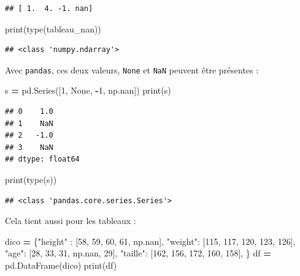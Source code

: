 \documentclass[
  12pt,
]{book}
\newenvironment{Shaded}{\begin{snugshade}}{\end{snugshade}}
\newcommand{\BuiltInTok}[1]{#1}
\newcommand{\DecValTok}[1]{\textcolor[rgb]{0.00,0.00,0.81}{#1}}
\newcommand{\NormalTok}[1]{#1}
\newcommand{\OperatorTok}[1]{\textcolor[rgb]{0.81,0.36,0.00}{\textbf{#1}}}
\newcommand{\StringTok}[1]{\textcolor[rgb]{0.31,0.60,0.02}{#1}}
\newcommand{\VariableTok}[1]{\textcolor[rgb]{0.00,0.00,0.00}{#1}}
\numberwithin{equation}{section}
\numberwithin{countremarque}{section}
\begin{document}
\begin{lstlisting}
## [ 1.  4. -1. nan]
\end{lstlisting}

\begin{Shaded}
\begin{Highlighting}[]
\BuiltInTok{print}\NormalTok{(}\BuiltInTok{type}\NormalTok{(tableau\_nan))}
\end{Highlighting}
\end{Shaded}

\begin{lstlisting}
## <class 'numpy.ndarray'>
\end{lstlisting}

Avec \texttt{pandas}, ces deux valeurs, \texttt{None} et \texttt{NaN} peuvent être présentes :

\begin{Shaded}
\begin{Highlighting}[]
\NormalTok{s }\OperatorTok{=}\NormalTok{ pd.Series([}\DecValTok{1}\NormalTok{, }\VariableTok{None}\NormalTok{, }\OperatorTok{{-}}\DecValTok{1}\NormalTok{, np.nan])}
\BuiltInTok{print}\NormalTok{(s)}
\end{Highlighting}
\end{Shaded}

\begin{lstlisting}
## 0    1.0
## 1    NaN
## 2   -1.0
## 3    NaN
## dtype: float64
\end{lstlisting}

\begin{Shaded}
\begin{Highlighting}[]
\BuiltInTok{print}\NormalTok{(}\BuiltInTok{type}\NormalTok{(s))}
\end{Highlighting}
\end{Shaded}

\begin{lstlisting}
## <class 'pandas.core.series.Series'>
\end{lstlisting}

Cela tient aussi pour les tableaux :

\begin{Shaded}
\begin{Highlighting}[]
\NormalTok{dico }\OperatorTok{=}\NormalTok{ \{}\StringTok{"height"}\NormalTok{ : [}\DecValTok{58}\NormalTok{, }\DecValTok{59}\NormalTok{, }\DecValTok{60}\NormalTok{, }\DecValTok{61}\NormalTok{, np.nan],}
        \StringTok{"weight"}\NormalTok{: [}\DecValTok{115}\NormalTok{, }\DecValTok{117}\NormalTok{, }\DecValTok{120}\NormalTok{, }\DecValTok{123}\NormalTok{, }\DecValTok{126}\NormalTok{],}
        \StringTok{"age"}\NormalTok{: [}\DecValTok{28}\NormalTok{, }\DecValTok{33}\NormalTok{, }\DecValTok{31}\NormalTok{, np.nan, }\DecValTok{29}\NormalTok{],}
        \StringTok{"taille"}\NormalTok{: [}\DecValTok{162}\NormalTok{, }\DecValTok{156}\NormalTok{, }\DecValTok{172}\NormalTok{, }\DecValTok{160}\NormalTok{, }\DecValTok{158}\NormalTok{],}
\NormalTok{       \} }
\NormalTok{df }\OperatorTok{=}\NormalTok{ pd.DataFrame(dico)}
\BuiltInTok{print}\NormalTok{(df)}
\end{Highlighting}
\end{Shaded}
\end{document}
